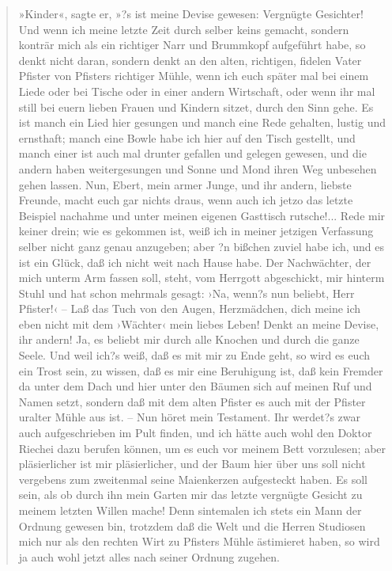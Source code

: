 \begin{verse}
»Kinder«, sagte er, »?s ist meine Devise gewesen: Vergnügte
Gesichter! Und wenn ich meine letzte Zeit durch selber keins
gemacht, sondern konträr mich als ein richtiger Narr und Brummkopf
aufgeführt habe, so denkt nicht daran, sondern denkt an den alten,
richtigen, fidelen Vater Pfister von Pfisters richtiger Mühle, wenn
ich euch später mal bei einem Liede oder bei Tische oder in einer
andern Wirtschaft, oder wenn ihr mal still bei euern lieben Frauen
und Kindern sitzet, durch den Sinn gehe. Es ist manch ein Lied hier
gesungen und manch eine Rede gehalten, lustig und ernsthaft; manch
eine Bowle habe ich hier auf den Tisch gestellt, und manch einer
ist auch mal drunter gefallen und gelegen gewesen, und die andern
haben weitergesungen und Sonne und Mond ihren Weg unbesehen gehen
lassen. Nun, Ebert, mein armer Junge, und ihr andern, liebste
Freunde, macht euch gar nichts draus, wenn auch ich jetzo das
letzte Beispiel nachahme und unter meinen eigenen Gasttisch
rutsche!... Rede mir keiner drein; wie es gekommen ist, weiß ich in
meiner jetzigen Verfassung selber nicht ganz genau anzugeben; aber
?n bißchen zuviel habe ich, und es ist ein Glück, daß ich nicht
weit nach Hause habe. Der Nachwächter, der mich unterm Arm fassen
soll, steht, vom Herrgott abgeschickt, mir hinterm Stuhl und hat
schon mehrmals gesagt: ›Na, wenn?s nun beliebt, Herr Pfister!‹ –
Laß das Tuch von den Augen, Herzmädchen, dich meine ich eben nicht
mit dem ›Wächter‹ mein liebes Leben! Denkt an meine Devise, ihr
andern! Ja, es beliebt mir durch alle Knochen und durch die ganze
Seele. Und weil ich?s weiß, daß es mit mir zu Ende geht, so wird es
euch ein Trost sein, zu wissen, daß es mir eine Beruhigung ist, daß
kein Fremder da unter dem Dach und hier unter den Bäumen sich auf
meinen Ruf und Namen setzt, sondern daß mit dem alten Pfister es
auch mit der Pfister uralter Mühle aus ist. – Nun höret mein
Testament. Ihr werdet?s zwar auch aufgeschrieben im Pult finden,
und ich hätte auch wohl den Doktor Riechei dazu berufen können, um
es euch vor meinem Bett vorzulesen; aber pläsierlicher ist mir
pläsierlicher, und der Baum hier über uns soll nicht vergebens zum
zweitenmal seine Maienkerzen aufgesteckt haben. Es soll sein, als
ob durch ihn mein Garten mir das letzte vergnügte Gesicht zu meinem
letzten Willen mache! Denn sintemalen ich stets ein Mann der
Ordnung gewesen bin, trotzdem daß die Welt und die Herren Studiosen
mich nur als den rechten Wirt zu Pfisters Mühle ästimieret haben,
so wird ja auch wohl jetzt alles nach seiner Ordnung zugehen.


\end{verse}
